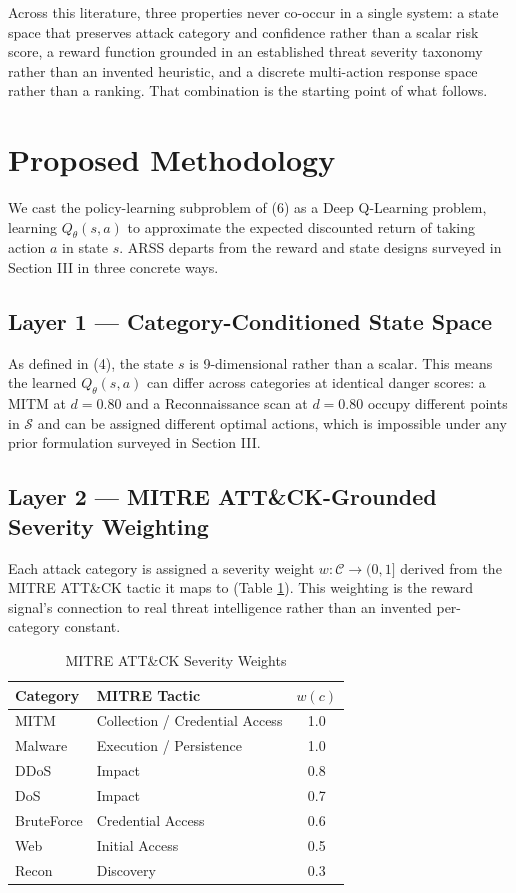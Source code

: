 \documentclass[conference]{IEEEtran}
\newcommand{\danger}{d}
\newcommand{\sev}{w}
\begin{document}
Across this literature, three properties never co-occur in a single system: a state space that preserves attack category and confidence rather than a scalar risk score, a reward function grounded in an established threat severity taxonomy rather than an invented heuristic, and a discrete multi-action response space rather than a ranking. That combination is the starting point of what follows.

\section{Proposed Methodology}

We cast the policy-learning subproblem of (6) as a Deep Q-Learning problem, learning $Q_\theta(s,a)$ to approximate the expected discounted return of taking action $a$ in state $s$. ARSS departs from the reward and state designs surveyed in Section III in three concrete ways.

\subsection{Layer 1 --- Category-Conditioned State Space}

As defined in (4), the state $s$ is 9-dimensional rather than a scalar. This means the learned $Q_\theta(s,a)$ can differ across categories at identical danger scores: a MITM at $\danger=0.80$ and a Reconnaissance scan at $\danger=0.80$ occupy different points in $\mathcal{S}$ and can be assigned different optimal actions, which is impossible under any prior formulation surveyed in Section III.

\subsection{Layer 2 --- MITRE ATT\&CK-Grounded Severity Weighting}

Each attack category is assigned a severity weight $\sev: \mathcal{C} \rightarrow (0,1]$ derived from the MITRE ATT\&CK tactic \cite{mitre_attack} it maps to (Table \ref{table:mitre}). This weighting is the reward signal's connection to real threat intelligence rather than an invented per-category constant.

\begin{table}[t]
\caption{MITRE ATT\&CK Severity Weights}
\label{table:mitre}
\centering
\begin{tabular}{|l|l|c|}
\hline
\textbf{Category} & \textbf{MITRE Tactic} & $\sev(c)$ \\
\hline
MITM & Collection / Credential Access & 1.0 \\
Malware & Execution / Persistence & 1.0 \\
DDoS & Impact & 0.8 \\
DoS & Impact & 0.7 \\
BruteForce & Credential Access & 0.6 \\
Web & Initial Access & 0.5 \\
Recon & Discovery & 0.3 \\
\hline
\end{tabular}
\end{table}
\end{document}
